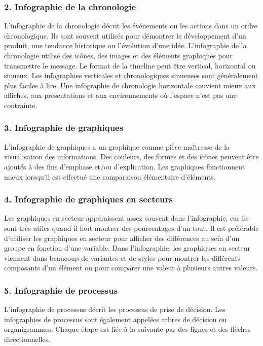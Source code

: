 \documentclass[french, a4paper, 12pt]{report}
\begin{document}
\subsubsection{2. Infographie de la chronologie }
L'infographie de la chronologie décrit les événements ou les actions dans un ordre chronologique. Ils sont souvent utilisés pour démontrer le développement d’un produit, une tendance historique ou l’évolution d’une idée. L'infographie de la chronologie utilise des icônes, des images et des éléments graphiques pour transmettre le message. Le format de la timeline peut être vertical, horizontal ou sinueux. Les infographies verticales et chronologiques sinueuses sont généralement plus faciles à lire. Une infographie de chronologie horizontale convient mieux aux affiches, aux présentations et aux environnements où l'espace n'est pas une contrainte.

\subsubsection{3. Infographie de graphiques }
L’infographie de graphiques a un graphique comme pièce maîtresse de la visualisation des informations. Des couleurs, des formes et des icônes peuvent être ajoutés à des fins d'emphase et/ou d'explication. Les graphiques fonctionnent mieux lorsqu’il est effectué une comparaison élémentaire d'éléments. 

\subsubsection{4. Infographie de graphiques en secteurs}
Les graphiques en secteur apparaissent assez souvent dans l'infographie, car ils sont très utiles quand il faut montrer des pourcentages d'un tout. Il est préférable d'utiliser les graphiques en secteur pour afficher des différences au sein d'un groupe en fonction d'une variable. Dans l'infographie, les graphiques en secteur viennent dans beaucoup de variantes et de styles pour montrer les différents composants d’un élément ou pour comparer une valeur à plusieurs autres valeurs.

\subsubsection{5. Infographie de processus }
L’infographie de processus décrit les processus de prise de décision. Les infographies de processus sont également appelées arbres de décision ou organigrammes. Chaque étape est liée à la suivante par des lignes et des flèches directionnelles. 
\end{document}
